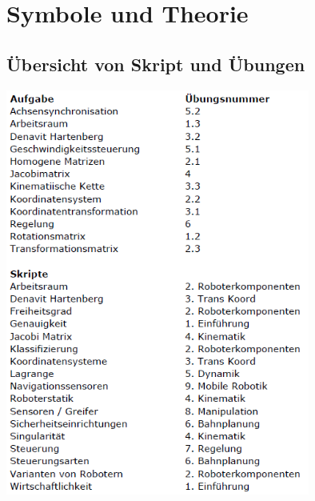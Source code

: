 \section{Symbole und Theorie}



	\subsection{Übersicht von Skript und Übungen}
	\includegraphics[width=10cm]{./bilder/uebersicht}